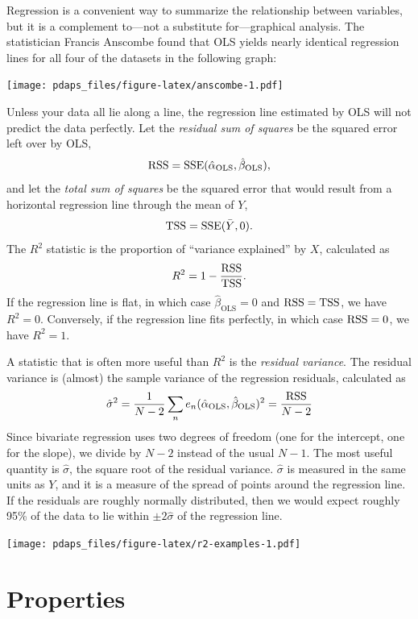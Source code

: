 \documentclass[
  12pt,
  oneside,openany]{book}
\begin{document}
Regression is a convenient way to summarize the relationship between variables, but it is a complement to---not a substitute for---graphical analysis. The statistician Francis Anscombe found that OLS yields nearly identical regression lines for all four of the datasets in the following graph:

\texttt{[image: pdaps\_files/figure-latex/anscombe-1.pdf]}

Unless your data all lie along a line, the regression line estimated by OLS will not predict the data perfectly. Let the \emph{residual sum of squares} be the squared error left over by OLS,
\[
\mathop{\rm RSS}\nolimits= \mathop{\rm SSE}\nolimits(\hat{\alpha}_{\text{OLS}}, \hat{\beta}_{\text{OLS}}),
\]
and let the \emph{total sum of squares} be the squared error that would result from a horizontal regression line through the mean of \(Y\),
\[
\mathop{\rm TSS}\nolimits= \mathop{\rm SSE}\nolimits(\bar{Y}, 0).
\]
The \(R^2\) statistic is the proportion of ``variance explained'' by \(X\), calculated as
\[
R^2 = 1 - \frac{\mathop{\rm RSS}\nolimits}{\mathop{\rm TSS}\nolimits}.
\]
If the regression line is flat, in which case \(\hat{\beta}_{\text{OLS}} = 0\) and \(\mathop{\rm RSS}\nolimits= \mathop{\rm TSS}\nolimits\), we have \(R^2= 0\). Conversely, if the regression line fits perfectly, in which case \(\mathop{\rm RSS}\nolimits= 0\), we have \(R^2 = 1\).

A statistic that is often more useful than \(R^2\) is the \emph{residual variance}. The residual variance is (almost) the sample variance of the regression residuals, calculated as
\[
\hat{\sigma}^2
= \frac{1}{N - 2} \sum_n e_n(\hat{\alpha}_{\text{OLS}}, \hat{\beta}_{\text{OLS}})^2
= \frac{\mathop{\rm RSS}\nolimits}{N - 2}
\]
Since bivariate regression uses two degrees of freedom (one for the intercept, one for the slope), we divide by \(N - 2\) instead of the usual \(N - 1\). The most useful quantity is \(\hat{\sigma}\), the square root of the residual variance. \(\hat{\sigma}\) is measured in the same units as \(Y\), and it is a measure of the spread of points around the regression line. If the residuals are roughly normally distributed, then we would expect roughly 95\% of the data to lie within \(\pm 2 \hat{\sigma}\) of the regression line.

\texttt{[image: pdaps\_files/figure-latex/r2-examples-1.pdf]}

\hypertarget{properties}{%
\section{Properties}\label{properties}}
\end{document}
